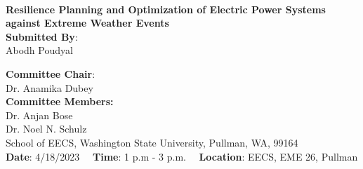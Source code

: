 \documentclass[hidelinks, 12pt]{article}
\begin{document}
\begin{titlepage}

\HRule \\
{ \Large \bfseries Resilience Planning and Optimization of Electric Power Systems against Extreme Weather Events}
\vspace{0.2 cm}
\HRule \\
 


\medskip
\large
{{\textbf{Submitted By}:\\ Abodh Poudyal }}\\ [0.5cm]

\medskip

\textbf{Committee Chair}:\\ Dr. Anamika Dubey \\ [0.5 cm]
\textbf{Committee Members:} \\ Dr. Anjan Bose\\
Dr. Noel N. Schulz\\

\vspace{1.5 cm}
\small School of EECS, Washington State University, Pullman, WA, 99164\\

\vspace{1.0 cm}
\small
\textbf{Date}: 4/18/2023 \ \ \textbf{Time}: 1 p.m - 3 p.m. \ \ \textbf{Location}: EECS, EME 26, Pullman


\vfill %
\end{titlepage}

\newpage
\end{document}

